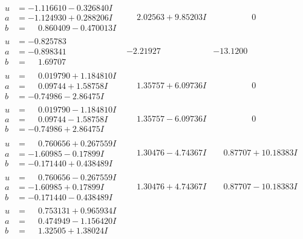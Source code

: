 \documentclass[1p]{elsarticle_modified}
\theoremstyle{definition}
\begin{document}
$$\begin{array}{c|c|c}
\begin{aligned}
u &= -1.116610 - 0.326840 I \\
a &= -1.124930 + 0.288206 I \\
b &= \phantom{-}0.860409 - 0.470013 I\end{aligned}
 & \phantom{-}2.02563 + 9.85203 I & \phantom{-0.000000 } 0 \\ \hline\begin{aligned}
u &= -0.825783\phantom{ +0.000000I} \\
a &= -0.898341\phantom{ +0.000000I} \\
b &= \phantom{-}1.69707\phantom{ +0.000000I}\end{aligned}
 & -2.21927\phantom{ +0.000000I} & -13.1200\phantom{ +0.000000I} \\ \hline\begin{aligned}
u &= \phantom{-}0.019790 + 1.184810 I \\
a &= \phantom{-}0.09744 + 1.58758 I \\
b &= -0.74986 - 2.86475 I\end{aligned}
 & \phantom{-}1.35757 + 6.09736 I & \phantom{-0.000000 } 0 \\ \hline\begin{aligned}
u &= \phantom{-}0.019790 - 1.184810 I \\
a &= \phantom{-}0.09744 - 1.58758 I \\
b &= -0.74986 + 2.86475 I\end{aligned}
 & \phantom{-}1.35757 - 6.09736 I & \phantom{-0.000000 } 0 \\ \hline\begin{aligned}
u &= \phantom{-}0.760656 + 0.267559 I \\
a &= -1.60985 - 0.17899 I \\
b &= -0.171440 + 0.438489 I\end{aligned}
 & \phantom{-}1.30476 - 4.74367 I & \phantom{-}0.87707 + 10.18383 I \\ \hline\begin{aligned}
u &= \phantom{-}0.760656 - 0.267559 I \\
a &= -1.60985 + 0.17899 I \\
b &= -0.171440 - 0.438489 I\end{aligned}
 & \phantom{-}1.30476 + 4.74367 I & \phantom{-}0.87707 - 10.18383 I \\ \hline\begin{aligned}
u &= \phantom{-}0.753131 + 0.965934 I \\
a &= \phantom{-}0.474949 - 1.156420 I \\
b &= \phantom{-}1.32505 + 1.38024 I\end{aligned}

\end{array}$$
\end{document}
